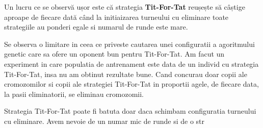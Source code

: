 Un lucru ce se observă ușor este că strategia \textbf{Tit-For-Tat} reușește să câștige aproape de fiecare dată când la initiaizarea turneului cu eliminare toate strategiile au ponderi egale si numarul de runde este mare.

Se observa o limitare in ceea ce priveste cautarea unei configuratii a agoritmului genetic care sa ofere un oponent bun pentru Tit-For-Tat. Am facut un experiment in care populatia de antrenament este data de un individ cu strategia Tit-For-Tat, insa nu am obtinut rezultate bune. Cand concurau doar copii ale cromozomilor si copii ale strategiei Tit-For-Tat in proportii agele, de fiecare data, la pasii eliminatorii, se eliminau cromozomii.
 
  
Strategia Tit-For-Tat poate fi batuta doar daca schimbam configuratia turneului cu eliminare. Avem nevoie de un numar mic de runde si de o str

















































































